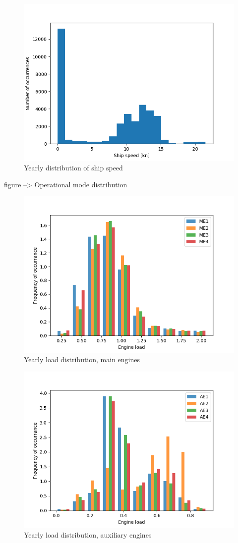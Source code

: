 \documentclass[preprint,12pt]{elsarticle}
\begin{document}
\begin{figure}[htbp]
	\centering
	\includegraphics[width=0.8\linewidth]{Figures/vship_hist}
	\caption{Yearly distribution of ship speed}
	\label{fig:vship_hist}
\end{figure}

figure --> Operational mode distribution
\begin{figure}[htbp]
	\centering
	\includegraphics[width=0.8\linewidth]{Figures/Hist_mainEngines}
	\caption{Yearly load distribution, main engines}
	\label{fig:loadME_hist}
\end{figure}

\begin{figure}[htbp]
	\centering
	\includegraphics[width=0.8\linewidth]{Figures/Hist_auxEngines}
	\caption{Yearly load distribution, auxiliary engines}
	\label{fig:loadAE_hist}
\end{figure}
\end{document}
